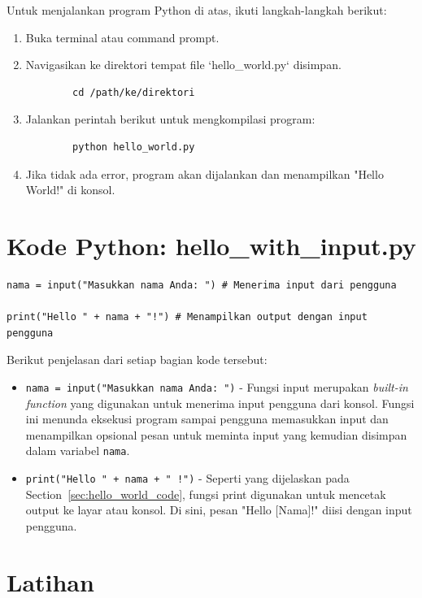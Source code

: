 Untuk menjalankan program Python di atas, ikuti langkah-langkah berikut:

\begin{enumerate}
	\item Buka terminal atau command prompt.
	\item Navigasikan ke direktori tempat file `hello_world.py` disimpan.
	\begin{verbatim}
		cd /path/ke/direktori
	\end{verbatim}
	\item Jalankan perintah berikut untuk mengkompilasi program:
	\begin{verbatim}
		python hello_world.py
	\end{verbatim}
	\item Jika tidak ada error, program akan dijalankan dan menampilkan "Hello World!" di konsol.
\end{enumerate}

\section{Kode Python: hello_with_input.py}

\begin{lstlisting}[style=PythonStyle, caption={Kode Python: hello_with_input.py}]
nama = input("Masukkan nama Anda: ") # Menerima input dari pengguna

print("Hello " + nama + "!") # Menampilkan output dengan input pengguna
\end{lstlisting}

Berikut penjelasan dari setiap bagian kode tersebut:

\begin{itemize}
\item \texttt{nama = input("Masukkan nama Anda: ")} - Fungsi input merupakan \textit{built-in function} yang digunakan untuk menerima input pengguna dari konsol. Fungsi ini menunda eksekusi program sampai pengguna memasukkan input dan menampilkan opsional pesan untuk meminta input yang kemudian disimpan dalam variabel \texttt{nama}.
\item \texttt{print("Hello " + nama + " !")} - Seperti yang dijelaskan pada Section~\ref{sec:hello_world_code}, fungsi print digunakan untuk mencetak output ke layar atau konsol. Di sini, pesan "Hello [Nama]!" diisi dengan input pengguna.
\end{itemize}


\section{Latihan}

